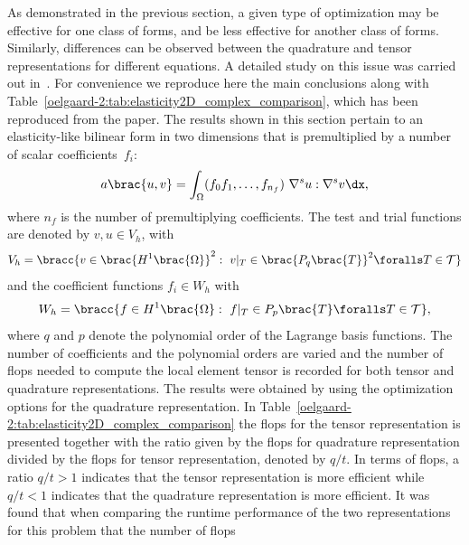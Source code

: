 As demonstrated in the previous section, a given type of optimization may
be effective for one class of forms, and be less effective for another
class of forms.  Similarly, differences can be observed between the
quadrature and tensor representations for different equations.  A detailed
study on this issue was carried out in~\citet{OelgaardWells2010}.
For convenience we reproduce here the main conclusions along with
Table~\ref{oelgaard-2:tab:elasticity2D_complex_comparison}, which has been
reproduced from the paper.  The results shown in this section pertain to
an elasticity-like bilinear form in two dimensions that is premultiplied
by a number of scalar coefficients~$f_{i}$:
%
\begin{equation}
  a\brac{u, v} = \int_{\Omega} (f_0 f_1, \ldots, f_{n_f} )\
  \nabla^s u : \nabla^s v \dx,
\label{oelgaard-2:eq:elasticity_form}
\end{equation}
%
where $n_f$ is the number of premultiplying coefficients.  The test and
trial functions are denoted by $v, u \in V_{h}$, with
%
\begin{equation}
  V_{h} = \bracc{v \in \brac{H^{1}\brac{\Omega}}^2: \ v\vert_T \in \brac{P_{q}\brac{T}}^2
   \foralls T \in \mathcal{T}}
\label{oelgaard-2:eq:elastictity_H1_vector_space}
\end{equation}
%
and the coefficient functions $f_{i} \in W_{h}$ with
%
\begin{equation}
  W_{h} = \bracc{f \in H^{1}\brac{\Omega}: \ f\vert_T \in P_{p}\brac{T}
   \foralls T \in \mathcal{T}},
\label{oelgaard-2:eq:elasticity_H1_space}
\end{equation}
%
where $q$ and $p$ denote the polynomial order of the Lagrange basis
functions.  The number of coefficients and the polynomial orders are
varied and the number of flops needed to compute the local element tensor
is recorded for both tensor and quadrature representations.  The results
were obtained by using the optimization options \emp{-f eliminate\_zeros
-f simplify\_expressions} for the quadrature representation.
In Table~\ref{oelgaard-2:tab:elasticity2D_complex_comparison} the flops
for the tensor representation is presented together with the ratio given
by the flops for quadrature representation divided by the flops for
tensor representation, denoted by $q/t$.  In terms of flops, a ratio
$q/t > 1$ indicates that the tensor representation is more efficient
while $q/t < 1$ indicates that the quadrature representation is more
efficient.  It was found that when comparing the runtime performance
of the two representations for this problem that the number of flops
